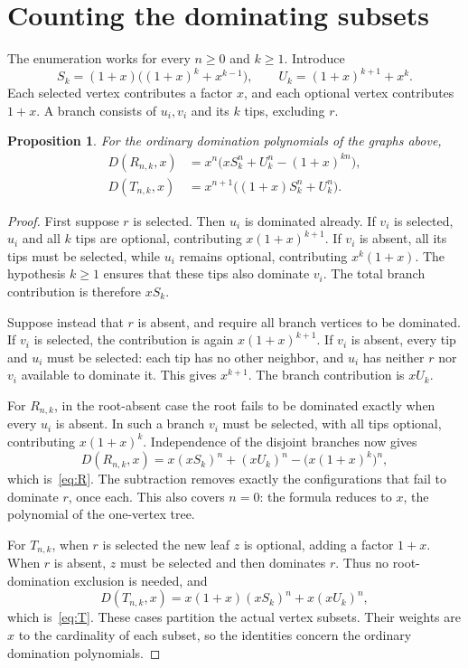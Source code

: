 \documentclass[11pt]{article}
\newtheorem{proposition}[theorem]{Proposition}
\newcommand{\D}{D}
\begin{document}
\section{Counting the dominating subsets}
The enumeration works for every $n\ge0$ and $k\ge1$. Introduce
\begin{equation}\label{eq:SU}
 S_k=(1+x)\bigl((1+x)^k+x^{k-1}\bigr),\qquad
 U_k=(1+x)^{k+1}+x^k.
\end{equation}
Each selected vertex contributes a factor $x$, and each optional vertex contributes $1+x$. A branch consists of $u_i,v_i$ and its $k$ tips, excluding $r$.

\begin{proposition}\label{prop:formula}
For the ordinary domination polynomials of the graphs above,
\begin{align}
 \D(R_{n,k},x)&=x^n\bigl(xS_k^n+U_k^n-(1+x)^{kn}\bigr),\label{eq:R}\\
 \D(T_{n,k},x)&=x^{n+1}\bigl((1+x)S_k^n+U_k^n\bigr).\label{eq:T}
\end{align}
\end{proposition}
\begin{proof}
First suppose $r$ is selected. Then $u_i$ is dominated already. If $v_i$ is selected, $u_i$ and all $k$ tips are optional, contributing $x(1+x)^{k+1}$. If $v_i$ is absent, all its tips must be selected, while $u_i$ remains optional, contributing $x^k(1+x)$. The hypothesis $k\ge1$ ensures that these tips also dominate $v_i$. The total branch contribution is therefore $xS_k$.

Suppose instead that $r$ is absent, and require all branch vertices to be dominated. If $v_i$ is selected, the contribution is again $x(1+x)^{k+1}$. If $v_i$ is absent, every tip and $u_i$ must be selected: each tip has no other neighbor, and $u_i$ has neither $r$ nor $v_i$ available to dominate it. This gives $x^{k+1}$. The branch contribution is $xU_k$.

For $R_{n,k}$, in the root-absent case the root fails to be dominated exactly when every $u_i$ is absent. In such a branch $v_i$ must be selected, with all tips optional, contributing $x(1+x)^k$. Independence of the disjoint branches now gives
\[
 \D(R_{n,k},x)=x(xS_k)^n+(xU_k)^n-
                    \bigl(x(1+x)^k\bigr)^n,
\]
which is~\eqref{eq:R}. The subtraction removes exactly the configurations that fail to dominate $r$, once each. This also covers $n=0$: the formula reduces to $x$, the polynomial of the one-vertex tree.

For $T_{n,k}$, when $r$ is selected the new leaf $z$ is optional, adding a factor $1+x$. When $r$ is absent, $z$ must be selected and then dominates $r$. Thus no root-domination exclusion is needed, and
\[
 \D(T_{n,k},x)=x(1+x)(xS_k)^n+x(xU_k)^n,
\]
which is~\eqref{eq:T}. These cases partition the actual vertex subsets. Their weights are $x$ to the cardinality of each subset, so the identities concern the ordinary domination polynomials.
\end{proof}
\end{document}
